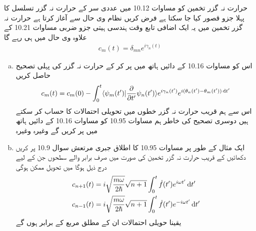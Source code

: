 حرارت نہ گزر تخمین کو مساوات 10.12 میں عددی سر  کے حرارت نہ گزر تسلسل کا پہلا جزو قصور کیا جا سکتا ہے فرض کریں نظام  وی حال سے آغاز کرتا ہے حرارت نہ گزر تخمین میں یہ ایک اضافی تابع وقت ہندسی ہیتی جزو ضربی مساوات 10.21 کے علاوہ  وی حال میں ہی رہے گا 
\begin{align*} 
c_m (t) = \delta_{mn} e^{i \gamma_n (t)}
\end{align*} 
\begin{enumerate}[a.]
\item
اس کو مساوات 10.16 کے دائیں ہاتھ میں پر کر کے حرارت نہ گزر کی پہلی تصحیح حاصل کریں 
\begin{align}
c_m (t) = c_m (0) - \int_0^t \langle \psi_m (t') | \frac{\partial}{\partial t'} \psi_n (t') \rangle e^{i \gamma_n (t')} e^{i (\theta_n (t') - \theta_m (t')) \dif t'}
\end{align}
اس سے ہم قریب حرارت نہ گزر خطوں میں تحویلی احتمالات کا حساب کر سکتے ہیں دوسری تصحیح کی خاطر ہم مساوات 10.95 کو مساوات 10.16 کے دائیں ہاتھ میں پر کریں گے وغیرہ وغیرہ 
\item
ایک مثال کے طور پر مساوات 10.95 کا اطلاق جبری مرتعش سوال 10.9 پر کریں دکھائیں کے قریب حرارت نہ گزر تخمین کی صورت میں صرف برابر والے سطحوں جن کے لیے درج ذیل ہوگا میں تحویل ممکن ہوگی 
\begin{align*}
c_{n + 1} (t)& = i \sqrt{\frac{m \omega}{2 \hslash}} \sqrt{n + 1} \int_0^t \dot{f} (t') e^{i \omega t'} \dif t' \\
c_{n - 1} (t) &= i \sqrt{\frac{m \omega}{2 \hslash}} \sqrt{n + 1} \int_0^t \dot{f} (t') e^{-i \omega t'} \dif t'
\end{align*}
یقینا حویلی احتمالات ان کے مطلق مربع کے برابر ہوں گے 
\end{enumerate}

